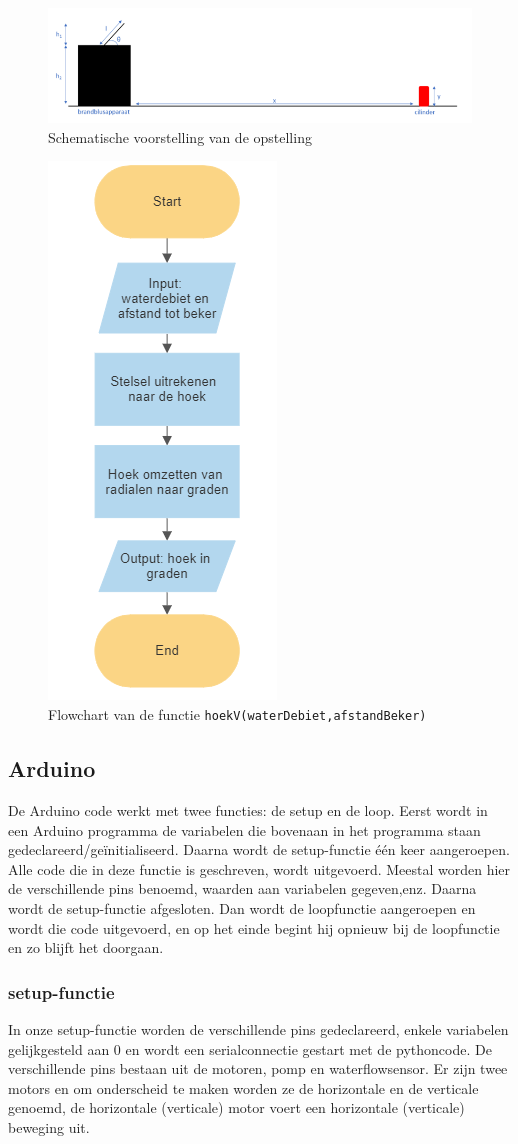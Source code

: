 \documentclass[kulak]{kulakarticle} %
\begin{document}
				\begin{figure} [h!]
					\centering
					\includegraphics[width = 1 \textwidth]{schematische voorstelling water LATEX}
					\caption{Schematische voorstelling van de opstelling}
					\label{schematische voorstelling}
				\end{figure}

				\begin{figure} [h!]
					\centering
					\includegraphics[width = .2 \textwidth]{flowchart_hoekV}
				\cprotect\caption{Flowchart van de functie \verb*|hoekV(waterDebiet,afstandBeker)|}
					\label{flowchart_water}
				\end{figure}

	\subsection{Arduino}
		De Arduino code werkt met twee functies: de setup en de loop. Eerst wordt in een Arduino programma de variabelen die bovenaan in het programma staan gedeclareerd/geïnitialiseerd. Daarna wordt de setup-functie één keer aangeroepen. Alle code die in deze functie is geschreven, wordt uitgevoerd. Meestal worden hier de verschillende pins benoemd, waarden aan variabelen gegeven,enz. Daarna wordt de setup-functie afgesloten. Dan wordt de loopfunctie aangeroepen en wordt die code uitgevoerd, en op het einde begint hij opnieuw bij de loopfunctie en zo blijft het doorgaan.
		
		\subsubsection{setup-functie}
		In onze setup-functie worden de verschillende pins gedeclareerd, enkele variabelen gelijkgesteld aan 0 en wordt een serialconnectie gestart met de pythoncode. De verschillende pins bestaan uit de motoren, pomp en waterflowsensor. Er zijn twee motors en om onderscheid te maken worden ze de horizontale en de verticale genoemd, de horizontale (verticale) motor voert een horizontale (verticale) beweging uit.
		
\end{document}
